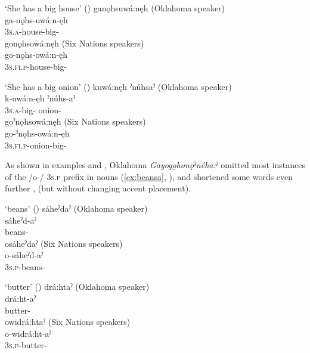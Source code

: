 \ea \label{ex:big.house}
‘She has a big house’ (\cite[249]{mithun_incipient_1989})
\ea ganǫhsuwá:nęh (Oklahoma speaker)\\\label{ex:big.housea}
\gll ga-nǫhs-uwá:n-ęh\\
\textsc{3s.a}-house-big-{\stative} \\
\ex gonǫhsowá:nęh (Six Nations speakers)\\\label{ex:big.houseb}
\gll go-nǫhs-owá:n-ęh\\
\textsc{3s.fi.p}-house-big-{\stative} \\
\z
\z

\ea \label{ex:big.onion} ‘She has a big onion’ (\cite[250]{mithun_incipient_1989})
\ea kuwá:nęh ˀnúhsaˀ (Oklahoma speaker)\\\label{ex:big.oniona}
\gll k-uwá:n-ęh ˀnúhs-aˀ\\
\textsc{3s.a}-big-{\stative} onion-{\nounstemformer} \\
\ex go̱ˀnǫhsowá:nęh  (Six Nations speakers)\\ \label{ex:big.onionb}
\gll go̱-ˀnǫhs-owá:n-ęh \\
\textsc{3s.fi.p}-onion-big-{\stative}\\ 
\z
\z

As shown in examples  and , Oklahoma \textit{Gayogo̱honǫˀnéha:ˀ} omitted most instances of the /o-/ \textsc{3s.p} prefix in nouns (\ref{ex:beansa}, \cite[251--252]{mithun_incipient_1989}), and shortened some words even further , (but without changing accent placement).


\ea\label{ex:beans} ‘beans’ (\cite[254]{mithun_incipient_1989}) 
\ea\label{ex:beansa} sáheˀdaˀ (Oklahoma speaker)\\
\gll sáheˀd-aˀ\\
beans-{\nounstemformer}\\

\ex\label{ex:beansb} osáheˀdaˀ (Six Nations speakers)\\
\gll o-sáheˀd-aˀ\\
\textsc{3s.p}-beans-{\nounstemformer}\\
\z
\z

\ea \label{ex:butter} ‘butter’ (\cite[255]{mithun_incipient_1989})
\ea \label{ex:buttera}drá:htaˀ (Oklahoma speaker)\\
\gll drá:ht-aˀ\\
butter-{\nounstemformer}\\

\ex \label{ex:butterb}owidrá:htaˀ (Six Nations speakers)\\
\gll o-widrá:ht-aˀ\\
\textsc{3s.p}-butter-{\nounstemformer}\\
\z
\z

